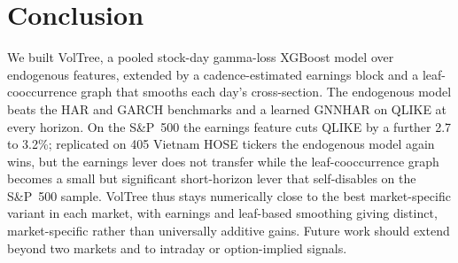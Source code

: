 \documentclass[runningheads,a4paper]{llncs}
\begin{document}
\section{Conclusion}
We built VolTree, a pooled stock-day gamma-loss XGBoost model over endogenous features, extended by a
cadence-estimated earnings block and a leaf-cooccurrence graph that smooths each day's cross-section. The
endogenous model beats the HAR and GARCH benchmarks and a learned GNNHAR on QLIKE at every horizon. On the
S\&P~500 the earnings feature cuts QLIKE by a further
2.7 to 3.2\%; replicated on 405 Vietnam HOSE tickers the endogenous model again wins, but the earnings lever
does not transfer while the leaf-cooccurrence graph becomes a small but significant short-horizon lever that
self-disables on the S\&P~500 sample. VolTree thus stays numerically close to the best
market-specific variant in each market, with earnings and leaf-based smoothing giving distinct,
market-specific rather than universally additive gains. Future work should extend beyond two markets and to
intraday or option-implied signals.
\end{document}
